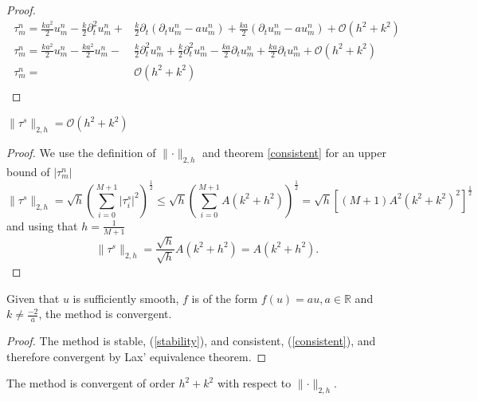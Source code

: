 \begin{proof}
    \begin{align*}
        \tau_m^n = \frac{ka^2}{2}u_{m}^{n}  - \frac{k}{2} \partial_t^2 u_{m}^{n} +& \frac{k}{2} \partial_t \left(\partial_t u_{m}^{n}   - au_{m}^{n} \right) + \frac{ka}{2} \left( \partial_t  u_{m}^{n} - a u_{m}^{n}\right)+ \mathcal{O}(h^2 + k^2) \\
        \tau_m^n = \frac{ka^2}{2}u_{m}^{n} - \frac{ka^2}{2}u_{m}^{n}  -& \frac{k}{2} \partial_t^2 u_{m}^{n} + \frac{k}{2} \partial_t^2 u_{m}^{n} - \frac{ka}{2} \partial_t u_{m}^{n} + \frac{ka}{2} \partial_t  u_{m}^{n}+ \mathcal{O}(h^2 + k^2) \\
        \tau_m^n =& \mathcal{O}(h^2 + k^2) \\
    \end{align*}
\end{proof}

\begin{corollary}
    \label{corollary:norm_tau}
    $\lVert\tau^s \lVert_{2, h} =\mathcal{O}(h^2+k^2)$
\end{corollary}

\begin{proof}
We use the definition of $\lVert\cdot\lVert_{2,h}$ and theorem \ref{consistent} for an upper bound of $\lvert \tau_m^n\lvert$
    $$\lVert\tau^s \lVert_{2, h} = \sqrt{h}\left( \sum_{i=0}^{M+1} \lvert\tau^s_i \lvert^2 \right)^\frac{1}{2} \leq \sqrt{h}\left( \sum_{i=0}^{M+1} A(k^2+h^2) \right)^\frac{1}{2} = \sqrt{h}\left[ (M+1) A^2(k^2+k^2)^2 \right]^\frac{1}{2}$$
    and using that $h = \frac{1}{M+1}$
    $$\lVert\tau^s \lVert_{2, h} = \frac{\sqrt{h}}{\sqrt{h}}A(k^2+h^2) = A(k^2+h^2).$$
\end{proof}
\begin{theorem}
    \label{convergence_lax}
    Given that $u$ is sufficiently smooth,  $f$ is of the form $f(u)=au, a\in \mathbb{R}$ and $k \neq \frac{-2}{a}$, the method is convergent.
\end{theorem}

\begin{proof}
    The method is stable, (\ref{stability}), and consistent, (\ref{consistent}), and therefore convergent by Lax' equivalence theorem.
\end{proof}


\begin{theorem}
  \label{thm:conv_order}
    The method is convergent of order $h^2+k^2$ with respect to $\lVert\cdot \lVert_{2, h}$.
\end{theorem}

